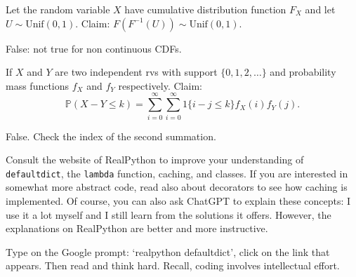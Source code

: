 \documentclass[stochastic-or]{subfiles}
\begin{document}
\begin{truefalse}
Let the random variable \(X\) have cumulative distribution function \(F_X\) and let \(U\sim\text{Unif}(0,1)\). Claim: \(F(F^{-1}(U))\sim\text{Unif}(0,1)\).
\begin{solution}
False:  not true for non continuous CDFs.
\end{solution}
\end{truefalse}

\begin{truefalse}
If \(X\) and \(Y\) are two independent rvs with support \(\{0, 1, 2, \ldots\}\) and probability mass functions \(f_X\) and \(f_Y\) respectively. Claim:
$$\mathbb{P}(X-Y\le k)=\sum_{i=0}^{\infty}\sum_{i=0}^{\infty}1\{i-j\le k\}f_X(i)f_Y(j).$$
\begin{solution}
False. Check the index of the second summation.
\end{solution}
\end{truefalse}


\begin{exercise}
Consult the website of RealPython to improve your understanding of \texttt{defaultdict}, the \texttt{lambda} function, caching, and classes.
If you are interested in somewhat more abstract code, read also about decorators to see how caching is implemented.
Of course, you can also ask ChatGPT to explain these concepts: I use it a lot myself and I still learn from the solutions it offers.
However, the explanations on RealPython are better and more instructive.
\begin{solution}
Type on the Google prompt: `realpython defaultdict', click on the link that appears.  Then read and think hard. Recall, coding involves intellectual effort.
\end{solution}
\end{exercise}
\end{document}
